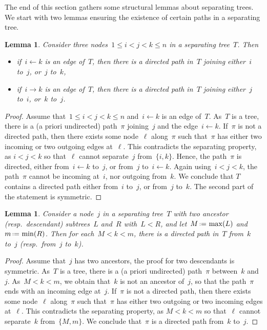 \documentclass{amsart}
\newtheorem{lemma}[theorem]{Lemma}
\theoremstyle{definition}
\newcommand{\eqdef}{\mbox{\,\raisebox{0.2ex}{\scriptsize\ensuremath{\mathrm:}}\ensuremath{=}\,}} %
\begin{document}
The end of this section gathers some structural lemmas about separating trees.
We start with two lemmas ensuring the existence of certain paths in a separating tree.

\begin{lemma}
\label{lem:separatingTree1}
Consider three nodes~$1 \le i < j < k \le n$ in a separating tree~$T$. Then
\begin{itemize}
\item if~$i \leftarrow k$ is an edge of~$T$, then there is a directed path in~$T$ joining either~$i$ to~$j$, or~$j$ to~$k$,
\item if~$i \to k$ is an edge of~$T$, then there is a directed path in~$T$ joining either~$j$ to~$i$, or~$k$ to~$j$.
\end{itemize}
\end{lemma}

\begin{proof}
Assume that~$1 \le i < j < k \le n$ and~$i \leftarrow k$ is an edge of~$T$.
As~$T$ is a tree, there is a (a priori undirected) path~$\pi$ joining~$j$ and the edge~$i \leftarrow k$.
If~$\pi$ is not a directed path, then there exists some node~$\ell$ along~$\pi$ such that~$\pi$ has either two incoming or two outgoing edges at~$\ell$.
This contradicts the separating property, as $i < j < k$ so that~$\ell$ cannot separate~$j$ from~$\{i,k\}$.
Hence, the path~$\pi$ is directed, either from~$i \leftarrow k$ to~$j$, or from~$j$ to~$i \leftarrow k$.
Again using~$i < j < k$, the path~$\pi$ cannot be incoming at~$i$, nor outgoing from~$k$.
We conclude that $T$ contains a directed path either from~$i$ to~$j$, or from~$j$ to~$k$.
The second part of the statement is symmetric.
\end{proof}

\begin{lemma}
\label{lem:separatingTree3}
Consider a node~$j$ in a separating tree~$T$ with two ancestor (resp.~descendant) subtrees~$L$ and~$R$ with~$L < R$, and let~$M \eqdef \max(L)$ and~$m \eqdef \min(R)$. Then for each~${M < k < m}$, there is a directed path in~$T$ from~$k$ to~$j$ (resp.~from~$j$ to~$k$).
\end{lemma}

\begin{proof}
Assume that~$j$ has two ancestors, the proof for two descendants is symmetric.
As~$T$ is a tree, there is a (a priori undirected) path~$\pi$ between~$k$ and~$j$.
As~$M < k < m$, we obtain that~$k$ is not an ancestor of~$j$, so that the path~$\pi$ ends with an incoming edge at~$j$.
If~$\pi$ is not a directed path, then there exists some node~$\ell$ along~$\pi$ such that~$\pi$ has either two outgoing or two incoming edges at~$\ell$.
This contradicts the separating property, as $M < k < m$ so that~$\ell$ cannot separate~$k$ from~$\{M,m\}$.
We conclude that~$\pi$ is a directed path from~$k$ to~$j$.
\end{proof}
\end{document}
